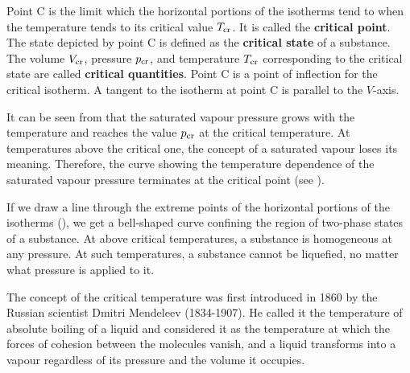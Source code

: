 Point C is the limit which the horizontal portions of the isotherms tend to when the temperature tends to its critical value $T_{\text{cr}}$. It is called the \textbf{critical point}. The state depicted by point C is defined as the \textbf{critical state} of a substance. The volume $V_{\text{cr}}$, pressure $p_{\text{cr}}$, and temperature $T_{\text{cr}}$ corresponding to the critical state are called \textbf{critical quantities}. Point C is a point of inflection for the critical isotherm. A tangent to the isotherm at point C is parallel to the $V$-axis.

It can be seen from  that the saturated vapour pressure grows with the temperature and reaches the value $p_{\text{cr}}$ at the critical temperature. At temperatures above the critical one, the concept of a saturated vapour loses its meaning. Therefore, the curve showing the temperature dependence of the saturated vapour pressure terminates at the critical point (see ).

If we draw a line through the extreme points of the horizontal portions of the isotherms (), we get a bell-shaped curve confining the region of two-phase states of a substance. At above critical temperatures, a substance is homogeneous at any pressure. At such temperatures, a substance cannot be liquefied, no matter what pressure is applied to it.

The concept of the critical temperature was first introduced in 1860 by the Russian scientist Dmitri Mendeleev (1834-1907). He called it the temperature of absolute boiling of a liquid and considered it as the temperature at which the forces of cohesion between the molecules vanish, and a liquid transforms into a vapour regardless of its pressure and the volume it occupies.

